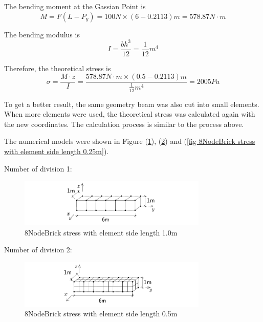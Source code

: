 \documentclass[fleqn,11pt]{article}
\begin{document}
The bending moment at the Gassian Point is 
\begin{equation}
  M=F(L-P_y)=100 N \times (6-0.2113) m = 578.87 N\cdot m
\end{equation}

The bending modulus is 
\begin{equation}
  I= \frac{bh^3}{12}=\frac{1}{12} m^4
\end{equation}

Therefore, the theoretical stress is 
\begin{equation}
  \sigma= \frac{M\cdot z}{I}= \frac{578.87 N\cdot m \times (0.5-0.2113) m }{\frac{1}{12} m^4}= 2005 Pa
\end{equation}



To get a better result, the same geometry beam was also cut into small elements. When more elements were used, the theoretical stress was calculated again with the new coordinates. The calculation process is similar to the process above. 

The numerical models were shown in Figure (\ref{fig 8NodeBrick stress with element side length 1.0m}), (\ref{fig 8NodeBrick stress with element side length 0.5m}) and (\ref{fig 8NodeBrick stress with element side length 0.25m}). 


Number of division 1:

\begin{figure}[H]
  \centering
  \includegraphics[width=9cm]{../Figure-files/beam_8brick.pdf}
  \caption{8NodeBrick stress with element side length 1.0m}
  \label{fig 8NodeBrick stress with element side length 1.0m}
\end{figure}

Number of division 2:

\begin{figure}[H]
  \centering
  \includegraphics[width=9cm]{../Figure-files/beam_8brick_more_2.pdf}
  \caption{8NodeBrick stress with element side length 0.5m}
  \label{fig 8NodeBrick stress with element side length 0.5m}
\end{figure}
\end{document}
